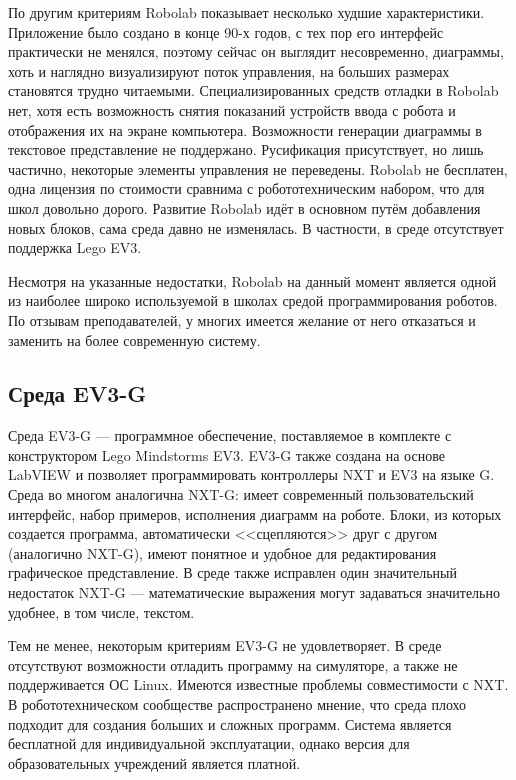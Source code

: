 \documentclass[a5paper]{article}
\begin{document}
По другим критериям Robolab показывает несколько худшие характеристики. Приложение было создано в конце 90-х 
годов, с тех пор его интерфейс практически не менялся, поэтому сейчас он выглядит несовременно, диаграммы, 
хоть и наглядно визуализируют поток управления, на больших размерах становятся трудно читаемыми. Специализированных 
средств отладки в Robolab нет, хотя есть возможность снятия показаний устройств ввода с робота и отображения 
их на экране компьютера. Возможности генерации диаграммы в текстовое представление не поддержано. Русификация 
присутствует, но лишь частично, некоторые элементы управления не переведены. Robolab не бесплатен, одна 
лицензия по стоимости сравнима с робототехническим набором, что для школ довольно дорого. Развитие Robolab 
идёт в основном путём добавления новых блоков, сама среда давно не изменялась. В частности, в среде 
отсутствует поддержка Lego EV3.

Несмотря на указанные недостатки, Robolab на данный момент является одной из наиболее широко используемой в 
школах средой программирования роботов. По отзывам преподавателей, у многих имеется желание от него 
отказаться и заменить на более современную систему.

\subsection{Среда EV3-G}

Среда EV3-G --- программное обеспечение, поставляемое в комплекте с конструктором Lego Mindstorms EV3. 
EV3-G также создана на основе LabVIEW и позволяет программировать контроллеры NXT и EV3 на языке G. 
Среда во многом аналогична NXT-G: имеет современный пользовательский интерфейс, набор примеров, исполнения диаграмм 
на роботе. Блоки, из которых создается программа, автоматически <<сцепляются>> друг с другом (аналогично NXT-G), 
имеют понятное и удобное для редактирования графическое представление. В среде также исправлен один 
значительный недостаток NXT-G --- математические выражения могут задаваться значительно удобнее, в том числе, текстом. 

Тем не менее, некоторым критериям EV3-G не удовлетворяет. В среде отсутствуют возможности отладить программу 
на симуляторе, а также не поддерживается ОС Linux. Имеются известные проблемы совместимости с NXT. В 
робототехническом сообществе распространено мнение, что среда плохо подходит для создания больших и сложных 
программ. Система является бесплатной для индивидуальной эксплуатации, однако версия для образовательных 
учреждений является платной.
\end{document}
